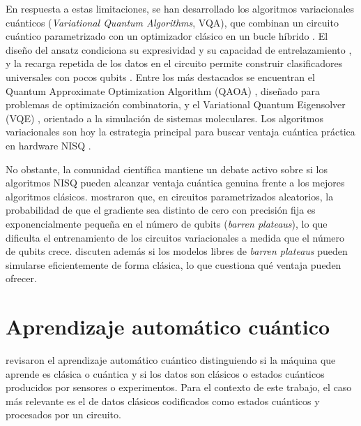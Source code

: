 En respuesta a estas limitaciones, se han desarrollado los algoritmos variacionales cuánticos (\textit{Variational Quantum Algorithms}, VQA), que combinan un circuito cuántico parametrizado con un optimizador clásico en un bucle híbrido \citep{cerezo2021, qzHybridQml}. El diseño del ansatz condiciona su expresividad y su capacidad de entrelazamiento \citep{sim2019}, y la recarga repetida de los datos en el circuito permite construir clasificadores universales con pocos qubits \citep{perezSalinas2020}. Entre los más destacados se encuentran el Quantum Approximate Optimization Algorithm (QAOA) \citep{farhi2014}, diseñado para problemas de optimización combinatoria, y el Variational Quantum Eigensolver (VQE) \citep{peruzzo2014}, orientado a la simulación de sistemas moleculares. Los algoritmos variacionales son hoy la estrategia principal para buscar ventaja cuántica práctica en hardware NISQ \citep{cerezo2021}.

No obstante, la comunidad científica mantiene un debate activo sobre si los algoritmos NISQ pueden alcanzar ventaja cuántica genuina frente a los mejores algoritmos clásicos. \cite{mcclean2018} mostraron que, en circuitos parametrizados aleatorios, la probabilidad de que el gradiente sea distinto de cero con precisión fija es exponencialmente pequeña en el número de qubits (\textit{barren plateaus}), lo que dificulta el entrenamiento de los circuitos variacionales a medida que el número de qubits crece. \cite{cerezo2023} discuten además si los modelos libres de \textit{barren plateaus} pueden simularse eficientemente de forma clásica, lo que cuestiona qué ventaja pueden ofrecer.

\section{Aprendizaje automático cuántico}

\cite{biamonte2017} revisaron el aprendizaje automático cuántico distinguiendo si la máquina que aprende es clásica o cuántica y si los datos son clásicos o estados cuánticos producidos por sensores o experimentos. Para el contexto de este trabajo, el caso más relevante es el de datos clásicos codificados como estados cuánticos y procesados por un circuito.

